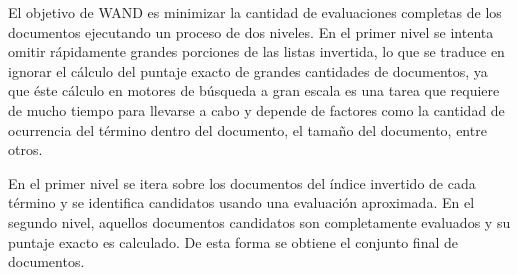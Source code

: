 El objetivo de WAND es minimizar la cantidad de evaluaciones completas de los documentos ejecutando un proceso de dos niveles. En el primer nivel se intenta omitir rápidamente grandes porciones de las listas invertida, lo que se traduce en ignorar el cálculo del puntaje exacto de grandes cantidades de documentos, ya que éste cálculo en motores de búsqueda a gran escala es una tarea que requiere de mucho tiempo para llevarse a cabo y depende de factores como la cantidad de ocurrencia del término dentro del documento, el tamaño del documento, entre otros.  

En el primer nivel se itera sobre los documentos del índice invertido de cada término y se identifica candidatos usando una evaluación aproximada. En el segundo nivel, aquellos documentos candidatos son completamente evaluados y su puntaje exacto es calculado. De esta forma se obtiene el conjunto final de documentos.